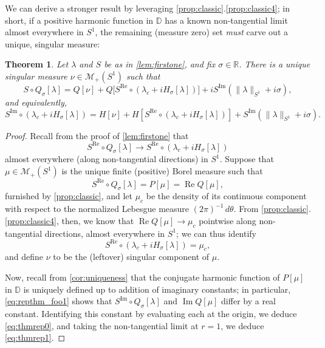 \documentclass{cams-l} %
\newcommand{\dave}[1]{#1}\newcommand{\davebegin}{}\newcommand{\daveend}{}\newcommand{\george}[1]{#1}
\newcommand{\RR}{\mathbb R}
\newcommand{\DD}{\mathbb D}
\newcommand{\cM}{\mathcal M}
\newcommand{\op}{\operatorname}
\renewcommand{\Re}{\op{Re}}
\renewcommand{\Im}{\op{Im}}
\newtheorem{theorem}{Theorem}[section]
\theoremstyle{definition}
\theoremstyle{remark}
\numberwithin{equation}{section}
\begin{document}
We can derive a stronger result by leveraging \cref{prop:classic}.\ref{prop:classic4}; in short, if a positive harmonic function in $\DD$ has a known non-tangential limit almost everywhere in $S^1$, the remaining (measure zero) set \emph{must} carve out a unique, singular measure:

\begin{theorem}\label{thm:representation}
    Let $\lambda$ and $S$ be as in \cref{lem:firstone}, and fix $\sigma\in\RR$. There is a unique singular measure $\nu\in\cM_+(S^1)$ such that
    \begin{equation}\label{eq:thmrep0}
        S\circ Q_\sigma[\lambda] = Q[\nu] + Q\big[S^{\Re}\circ(\lambda_c + iH_\sigma[\lambda])\big]  + iS^{\Im}(\|\lambda\|_{S^1}+i\sigma),
    \end{equation}
    and equivalently,
    \begin{equation}\label{eq:thmrep1}
    S^{\Im}\circ(\lambda_c+iH_\sigma[\lambda]) = H[\nu] + H[S^{\Re}\circ(\lambda_c+iH_\sigma[\lambda])] + S^{\Im}(\|\lambda\|_{S^1}+i\sigma).
    \end{equation}
\end{theorem}
\begin{proof}
    Recall from the proof of \cref{lem:firstone} that 
    \[S^{\Re}\circ Q_\sigma[\lambda]\to S^{\Re}\circ (\lambda_c+iH_\sigma[\lambda])\]
    almost everywhere (along non-tangential directions) in $S^1$. Suppose that $\mu\in\mathcal{M}_+(S^1)$ is the unique finite (positive) Borel measure such that 
    \begin{equation}\label{eq:repthm_foo1}
        S^{\Re}\circ Q_\sigma[\lambda] = P[\mu] = \Re Q[\mu],
    \end{equation}
    furnished by \cref{prop:classic}, and let $\mu_c$ be the density of its continuous component with respect to the normalized Lebesgue measure $(2\pi)^{-1}\,d\theta$. From \cref{prop:classic}.\ref{prop:classic4}, then, \dave{we know that $\Re Q[\mu]\to \mu_c$ pointwise along non-tangential directions}, almost everywhere in $S^1$; we can thus identify
    \[S^{\Re}\circ (\lambda_c+iH_\sigma[\lambda]) = \mu_c,\]
    and define $\nu$ to be the (leftover) singular component of $\mu$.

    Now, recall from \cref{cor:uniqueness} that the conjugate harmonic function of $P[\mu]$ in $\DD$ is uniquely defined up to addition of imaginary constants; in particular, \cref{eq:repthm_foo1} shows that $S^{\Im}\circ Q_\sigma[\lambda]$ and $\Im Q[\mu]$ differ by a real constant. Identifying this constant by evaluating each at the origin, we deduce \cref{eq:thmrep0}, and taking the non-tangential limit at $r=1$, we deduce \cref{eq:thmrep1}.
\end{proof}
\end{document}
